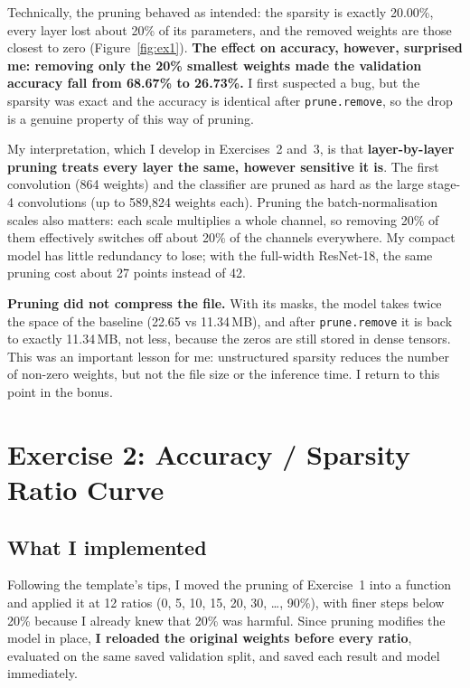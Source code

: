 \documentclass[11pt,a4paper]{article}
\newcommand{\code}[1]{\texttt{#1}}
\begin{document}
Technically, the pruning behaved as intended: the sparsity is exactly 20.00\%, every layer lost about 20\% of its parameters, and the removed weights are those closest to zero (Figure~\ref{fig:ex1}). \textbf{The effect on accuracy, however, surprised me: removing only the 20\% smallest weights made the validation accuracy fall from 68.67\% to 26.73\%.} I first suspected a bug, but the sparsity was exact and the accuracy is identical after \code{prune.remove}, so the drop is a genuine property of this way of pruning.

My interpretation, which I develop in Exercises~2 and~3, is that \textbf{layer-by-layer pruning treats every layer the same, however sensitive it is}. The first convolution (864 weights) and the classifier are pruned as hard as the large stage-4 convolutions (up to 589{,}824 weights each). Pruning the batch-normalisation scales also matters: each scale multiplies a whole channel, so removing 20\% of them effectively switches off about 20\% of the channels everywhere. My compact model has little redundancy to lose; with the full-width ResNet-18, the same pruning cost about 27 points instead of 42.

\textbf{Pruning did not compress the file.} With its masks, the model takes twice the space of the baseline (22.65 vs 11.34\,MB), and after \code{prune.remove} it is back to exactly 11.34\,MB, not less, because the zeros are still stored in dense tensors. This was an important lesson for me: unstructured sparsity reduces the number of non-zero weights, but not the file size or the inference time. I return to this point in the bonus.

\section{Exercise 2: Accuracy / Sparsity Ratio Curve}

\subsection{What I implemented}
Following the template's tips, I moved the pruning of Exercise~1 into a function and applied it at 12 ratios (0, 5, 10, 15, 20, 30, \dots, 90\%), with finer steps below 20\% because I already knew that 20\% was harmful. Since pruning modifies the model in place, \textbf{I reloaded the original weights before every ratio}, evaluated on the same saved validation split, and saved each result and model immediately.
\end{document}
